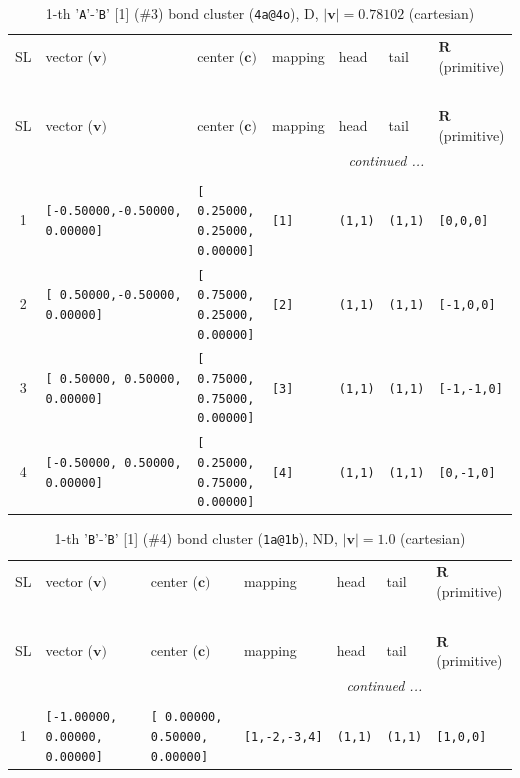\documentclass[fleqn,10pt,landscape]{jsarticle}
\begin{document}
\renewcommand{\arraystretch}{1.6}
\begin{longtable}[l]{cllllll}
\captionsetup{justification=raggedright, singlelinecheck=off}
\caption{1-th '\texttt{A}'-'\texttt{B}' [1] (\#3) bond cluster (\texttt{4a@4o}), D, $|\bm{v}|=0.78102$ (cartesian)}
 \\
 \hline \hline
SL & vector ($\bm{v})$ & center ($\bm{c})$ & mapping & head & tail & $\bm{R}$ (primitive) \\ \hline \endfirsthead

\multicolumn{6}{l}{\tablename\ \thetable{}} \\
 \hline \hline
SL & vector ($\bm{v})$ & center ($\bm{c})$ & mapping & head & tail & $\bm{R}$ (primitive) \\ \hline \endhead

 \hline \hline
\multicolumn{6}{r}{\footnotesize\it continued ...} \\ \endfoot

 \hline \hline
\multicolumn{6}{r}{} \\ \endlastfoot

1 & \texttt{[-0.50000,-0.50000, 0.00000]} & \texttt{[ 0.25000, 0.25000, 0.00000]} & \texttt{[1]} & \texttt{(1,1)} & \texttt{(1,1)} & \texttt{[0,0,0]} \\ \hline
2 & \texttt{[ 0.50000,-0.50000, 0.00000]} & \texttt{[ 0.75000, 0.25000, 0.00000]} & \texttt{[2]} & \texttt{(1,1)} & \texttt{(1,1)} & \texttt{[-1,0,0]} \\ \hline
3 & \texttt{[ 0.50000, 0.50000, 0.00000]} & \texttt{[ 0.75000, 0.75000, 0.00000]} & \texttt{[3]} & \texttt{(1,1)} & \texttt{(1,1)} & \texttt{[-1,-1,0]} \\ \hline
4 & \texttt{[-0.50000, 0.50000, 0.00000]} & \texttt{[ 0.25000, 0.75000, 0.00000]} & \texttt{[4]} & \texttt{(1,1)} & \texttt{(1,1)} & \texttt{[0,-1,0]} \\
\end{longtable}
\renewcommand{\arraystretch}{1.6}
\begin{longtable}[l]{cllllll}
\captionsetup{justification=raggedright, singlelinecheck=off}
\caption{1-th '\texttt{B}'-'\texttt{B}' [1] (\#4) bond cluster (\texttt{1a@1b}), ND, $|\bm{v}|=1.0$ (cartesian)}
 \\
 \hline \hline
SL & vector ($\bm{v})$ & center ($\bm{c})$ & mapping & head & tail & $\bm{R}$ (primitive) \\ \hline \endfirsthead

\multicolumn{6}{l}{\tablename\ \thetable{}} \\
 \hline \hline
SL & vector ($\bm{v})$ & center ($\bm{c})$ & mapping & head & tail & $\bm{R}$ (primitive) \\ \hline \endhead

 \hline \hline
\multicolumn{6}{r}{\footnotesize\it continued ...} \\ \endfoot

 \hline \hline
\multicolumn{6}{r}{} \\ \endlastfoot

1 & \texttt{[-1.00000, 0.00000, 0.00000]} & \texttt{[ 0.00000, 0.50000, 0.00000]} & \texttt{[1,-2,-3,4]} & \texttt{(1,1)} & \texttt{(1,1)} & \texttt{[1,0,0]} \\
\end{longtable}
\end{document}
